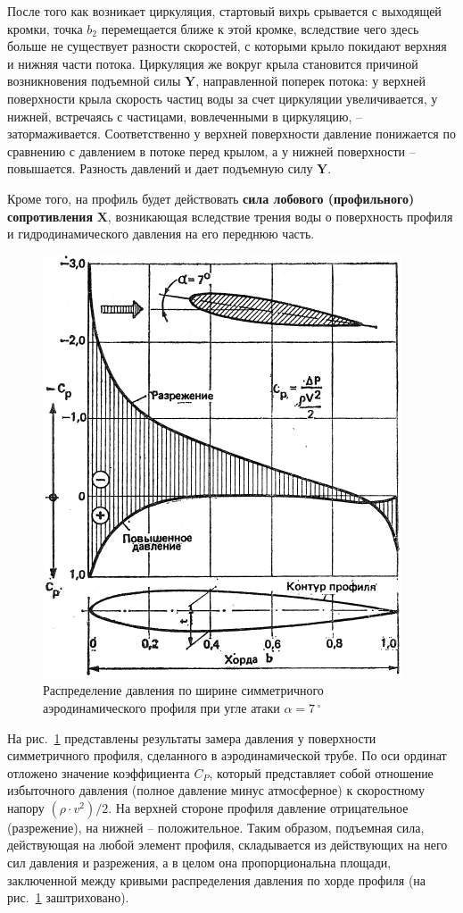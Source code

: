 \documentclass[a4paper, 12pt, twoside, final, book, russian, fittopage, cyremdash]{ncc}
\newcommand{\ve}[1]{\ensuremath{\mathbf{#1}}\xspace}
\newcommand{\gr}{\ensuremath{\,^\circ}\xspace}
\newcommand{\ris}[1]{\ref{fig:#1}}
\begin{document}
После того как возникает циркуляция, стартовый вихрь срывается с выходящей кромки, точка $b_2$ перемещается ближе к этой кромке, вследствие чего здесь больше не существует разности скоростей, с которыми крыло покидают верхняя и нижняя части потока. Циркуляция же вокруг крыла становится причиной возникновения подъемной силы \ve Y, направленной поперек потока: у верхней поверхности крыла скорость частиц воды за счет циркуляции увеличивается, у нижней, встречаясь с частицами, вовлеченными в циркуляцию, \--- затормаживается. Соответственно у верхней поверхности давление понижается по сравнению с давлением в потоке перед крылом, а у нижней поверхности \--- повышается. Разность давлений и дает подъемную силу \ve Y. 

Кроме того, на профиль будет действовать \textbf{сила лобового (профильного) сопротивления} \ve X, возникающая вследствие трения воды о поверхность профиля и гидродинамического давления на его переднюю часть.

\begin{figure}[htb]
  \centering
  \includegraphics[scale=1.2]{0009P.pdf}
  \caption{Распределение давления по ширине симметричного аэродинамического профиля при угле атаки $\alpha = 7\gr$}
  \label{fig:9}
\end{figure}

На рис.~\ris{9} представлены результаты замера давления у поверхности симметричного профиля, сделанного в аэродинамической трубе. По оси ординат отложено значение коэффициента $C_P$, который представляет собой отношение избыточного давления (полное давление минус атмосферное) к скоростному напору $(\rho \cdot v^2) / 2$. На верхней стороне профиля давление отрицательное (разрежение), на нижней \--- положительное. Таким образом, подъемная сила, действующая на любой элемент профиля, складывается из действующих на него сил давления и разрежения, а в целом она пропорциональна площади, заключенной между кривыми распределения давления по хорде профиля (на рис.~\ris{9} заштриховано).
\end{document}
